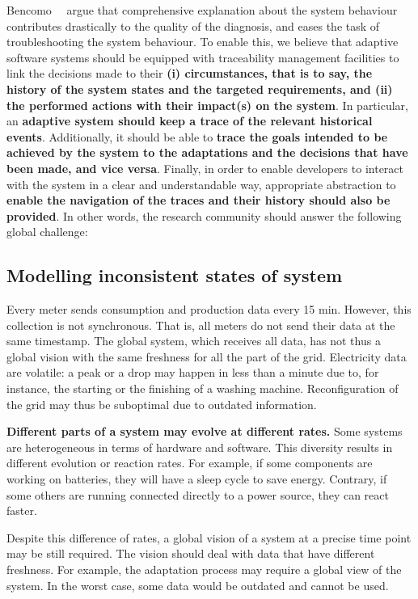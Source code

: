 Bencomo~\etal~\cite{DBLP:conf/iceccs/BencomoWSW12} argue that comprehensive explanation about the system behaviour contributes drastically to the quality of the diagnosis, and eases the task of troubleshooting the system behaviour. 
To enable this, we believe that adaptive software systems should be equipped with traceability management facilities to link the decisions made to their \textbf{(i) circumstances, that is to say, the history of the system states and the targeted requirements, and (ii) the performed actions with their impact(s) on the system}.
In particular, an \textbf{adaptive system should keep a trace of the relevant historical events}.
Additionally, it should be able to \textbf{trace the goals intended to be achieved by the system to the adaptations and the decisions that have been made, and vice versa}. 
Finally, in order to enable developers to interact with the system in a clear and understandable way, appropriate abstraction to \textbf{enable the navigation of the traces and their history should also be provided}.
In other words, the research community should answer the following global challenge:
\vspace{-2em}

\subsection{Modelling inconsistent states of system}
Every meter sends consumption and production data every 15 min.
However, this collection is not synchronous.
That is, all meters do not send their data at the same timestamp.
The global system, which receives all data, has not thus a global vision with the same freshness for all the part of the grid.
Electricity data are volatile: a peak or a drop may happen in less than a minute due to, for instance, the starting or the finishing of a washing machine.
Reconfiguration of the grid may thus be suboptimal due to outdated information.

\textbf{Different parts of a system may evolve at different rates.}
Some systems are heterogeneous in terms of hardware and software.
This diversity results in different evolution or reaction rates.
For example, if some components are working on batteries, they will have a sleep cycle to save energy.
Contrary, if some others are running connected directly to a power source, they can react faster.

Despite this difference of rates, a global vision of a system at a precise time point may be still required.
The vision should deal with data that have different freshness.
For example, the adaptation process may require a global view of the system.
In the worst case, some data would be outdated and cannot be used.

